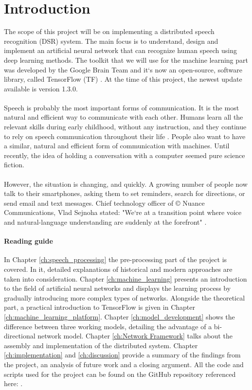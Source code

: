 \chapter{Introduction}\label{ch:introduction}
The scope of this project will be on implementing a distributed speech recognition (DSR) system.
The main focus is to understand, design and implement an artificial neural network that can recognize human speech using deep learning methods.
The toolkit that we will use for the machine learning part was developed by the Google Brain Team and it`s now an open-source, software library, called TensorFlow (TF) \cite{tensorflow2015-whitepaper}.
At the time of this project, the newest update available is version 1.3.0.\\\\
Speech is probably the most important forms of communication.
It is the most natural and efficient way to communicate with
each other. Humans learn all the relevant skills during early
childhood, without any instruction, and they continue to rely
on speech communication throughout their life \cite{kamblespeech}.
People also want to have a similar, natural and efficient form of communication with machines. 
Until recently, the idea of holding a conversation with a computer seemed pure science fiction.\\\\
However, the situation is changing, and quickly.
A growing number of people now talk to their smartphones, asking them to set reminders, search for directions, or send email and text messages.
Chief technology officer of \copyright{} Nuance Communications, Vlad Sejnoha stated: "We`re at a transition point where voice and natural-language understanding are suddenly at the forefront" \cite{kamblespeech}.
\subsubsection{Reading guide}
In Chapter \ref{ch:speech_processing} the pre-processing part of the project is covered. In it, detailed explanations of historical and modern approaches are taken into consideration. Chapter \ref{ch:machine_learning} presents an introduction to the field of artificial neural networks and displays the learning process by gradually introducing more complex types of networks. Alongside the theoretical part, a practical introduction to TensorFlow is given in Chapter \ref{ch:machine_learning_platform}. Chapter \ref{ch:model_development} shows the difference between three working models, detailing the advantage of a bi-directional network model. Chapter \ref{ch:Network Framework} talks about the assembly and implementation of the distributed system. Chapter \ref{ch:implementation} and \ref{ch:discussion} provide a summary of the findings from the project, an analysis of future work and a closing argument. All the code and scripts used for the project can be found on the GitHub repository referenced here: \cite{mavericks2017}.